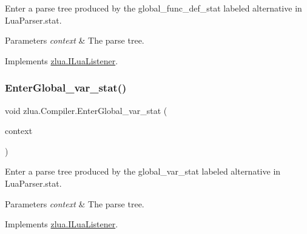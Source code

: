 Enter a parse tree produced by the {\ttfamily global\+\_\+func\+\_\+def\+\_\+stat} labeled alternative in Lua\+Parser.\+stat. 


\begin{DoxyParams}{Parameters}
{\em context} & The parse tree.\\
\hline
\end{DoxyParams}


Implements \mbox{\hyperlink{interfacezlua_1_1_i_lua_listener_add4d956e68d0679849896d682e181800}{zlua.\+I\+Lua\+Listener}}.

\mbox{\label{classzlua_1_1_compiler_a303b1c4d7a6cafe7c22c4ae4cdb2d296}} 
\subsubsection{\texorpdfstring{Enter\+Global\+\_\+var\+\_\+stat()}{EnterGlobal\_var\_stat()}}
{\footnotesize\ttfamily void zlua.\+Compiler.\+Enter\+Global\+\_\+var\+\_\+stat (\begin{DoxyParamCaption}\item[{\mbox{[}\+Not\+Null\mbox{]} \mbox{\hyperlink{classzlua_1_1_lua_parser_1_1_global__var__stat_context}{Lua\+Parser.\+Global\+\_\+var\+\_\+stat\+Context}}}]{context }\end{DoxyParamCaption})}



Enter a parse tree produced by the {\ttfamily global\+\_\+var\+\_\+stat} labeled alternative in Lua\+Parser.\+stat. 


\begin{DoxyParams}{Parameters}
{\em context} & The parse tree.\\
\hline
\end{DoxyParams}


Implements \mbox{\hyperlink{interfacezlua_1_1_i_lua_listener_a7a5992193e5625f3c6d07fcc05f3ce4c}{zlua.\+I\+Lua\+Listener}}.

\mbox{\label{classzlua_1_1_compiler_af6ae77f24cf841b02733f92d10c21074}} 
